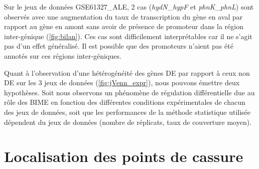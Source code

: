 \documentclass[12pt,a4paper]{report}
\begin{document}
\begin{onehalfspace}
Sur le jeux de données GSE61327\_ALE, 2 cas (\textit{hydN}\_\textit{hypF} et \textit{phnK}\_\textit{phnL}) sont observés avec une augmentation du taux de transcription du gène en aval par rapport au gène en amont sans avoir de présence de promoteur dans la région inter-génique (\autoref{fig:bilan}). Ces cas sont difficilement interprétables car il ne s'agit pas d'un effet généralisé. Il est possible que des promoteurs n'aient pas été annotés sur ces régions inter-géniques.

Quant à l'observation d'une hétérogénéité des gènes DE par rapport à ceux non DE sur les 3 jeux de données (\autoref{fig:jVenn_expr}), nous pouvons émettre deux hypothèses. Soit nous observons un phénomène de régulation différentielle due au rôle des BIME en fonction des différentes conditions expérimentales de chacun des jeux de données, soit que les performances de la méthode statistique utilisée dépendent du jeux de données (nombre de réplicats, taux de couverture moyen). 

\section*{Localisation des points de cassure}


\end{onehalfspace}
\end{document}
